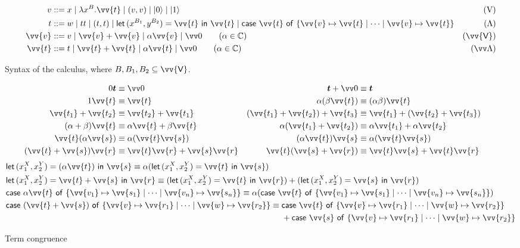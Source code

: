 \documentclass[runningheads,orivec,envcountsame,envcountsect]{llncs}
\newcommand\ket[1]{\ensuremath{|#1\rangle}}
\newcommand\s[1]{\ensuremath{\mathsf{#1}}}
\newcommand\Val{{\s V}}
\DeclareRobustCommand{\ValD}{\ensuremath{\vv{\mathsf{V}}}}
\def\C{\mathbb{C}}            %
\def\Val{\mathrm{V}}          %
\def\Pair#1#2{(#1,#2)} %
\def\Lam#1#2#3{\lambda#1^{#2}{.}#3} %
\def\letkeyword{\mathsf{let}}
\def\inkeyword{\mathsf{in}}
\def\LetP#1#2#3#4#5#6{\letkeyword\,\Pair{#1^{#2}}{#3^{#4}}=#5~\inkeyword~#6}
\def\gencase#1#2#3#4#5{\ensuremath{\mathsf{case}~#1~\mathsf{of}~\{#2\mapsto #4 \mid \dotsb \mid #3\mapsto #5\}}}
\begin{document}
\begin{table}[t]
  \begin{align*}
    v &::= x \mid \Lam{x}B{\vv{t}} \mid (v, v) \mid \ket{0} \mid \ket{1} &
    (\Val)\\
    t &::= w \mid tt \mid (t,t) \mid
    \LetP{x}{B_1}{y}{B_2}{\vv{t}}{\vv{t}}\mid
    \gencase{\vv{t}}{\vv{v}}{\vv{v}}{\vv{t}}{\vv{t}} &
    (\Lambda) \\
    \vv{v} &::= v \mid \vv{v}+\vv{v} \mid \alpha \vv{v} \mid \vv 0
    \qquad\hfill(\alpha\in\C) & (\ValD) \\
    \vv{t} &::= t \mid \vv{t}+\vv{t} \mid \alpha \vv{t} \mid \vv 0
    \qquad\hfill(\alpha\in\C) & (\vv \Lambda)
  \end{align*}
  \caption{Syntax of the calculus, where $B, B_1, B_2 \subseteq \ValD$.}
  \label{tab:Syntax}
\end{table}
\begin{table}[t]
  \begin{align*}
    0\vec t &\equiv \vv 0 & \vec t+\vv 0 &\equiv \vec t \\
    1\vv{t} &\equiv \vv{t} &
    \alpha(\beta\vv{t}) &\equiv (\alpha\beta)\vv{t} \\
    \vv{t_1}+\vv{t_2} &\equiv \vv{t_2}+\vv{t_1} &
    (\vv{t_1}+\vv{t_2})+\vv{t_3} &\equiv \vv{t_1}+(\vv{t_2}+\vv{t_3}) \\
    (\alpha+\beta)\vv{t} &\equiv \alpha\vv{t}+\beta\vv{t} &
    \alpha(\vv{t_1}+\vv{t_2}) &\equiv \alpha\vv{t_1}+\alpha\vv{t_2} \\
    \vv{t}(\alpha\vv{s}) &\equiv \alpha(\vv{t}\vv{s}) &
    (\alpha\vv{t})\vv{s} &\equiv \alpha(\vv{t}\vv{s}) \\
    (\vv{t}+\vv{s})\vv{r} &\equiv \vv{t}\vv{r}+\vv{s}\vv{r} &
    \vv{t}(\vv{s}+\vv{r}) &\equiv \vv{t}\vv{s}+\vv{t}\vv{r} &&
  \end{align*}
  \vspace{-2\baselineskip}
  \begin{align*}
    &\LetP{x_1}{X}{x_2}{Y}{(\alpha\vv{t})}{\vv{s}}
    \equiv \alpha(\LetP{x_1}{X}{x_2}{Y}{\vv{t}}{\vv{s}}) \\
    &\LetP{x_1}{X}{x_2}{Y}{\vv{t}+\vv{s}}{\vv{r}}
    \equiv
      (\LetP{x_1}{X}{x_2}{Y}{\vv{t}}{\vv{r}})
      +(\LetP{x_1}{X}{x_2}{Y}{\vv{s}}{\vv{r}}) 
      \\
    &\gencase{\alpha \vv{t}}{\vv{v_1}}{\vv{v_n}}{\vv{s_1}}{\vv{s_n}}
    \equiv \alpha(\gencase{\vv{t}}{\vv{v_1}}{\vv{v_n}}{\vv{s_1}}{\vv{s_n}}) \\
    &\gencase{(\vv{t}+\vv{s})}{\vv{v}}{\vv{w}}{\vv{r_1}}{\vv{r_2}}
    \equiv\begin{aligned}[t]
      &\gencase{\vv{t}}{\vv{v}}{\vv{w}}{\vv{r_1}}{\vv{r_2}}\\
      &+\gencase{\vv{s}}{\vv{v}}{\vv{w}}{\vv{r_1}}{\vv{r_2}}
    \end{aligned}
  \end{align*}
  \caption{Term congruence}
  \label{tab:Congruence}
\end{table}
\end{document}
